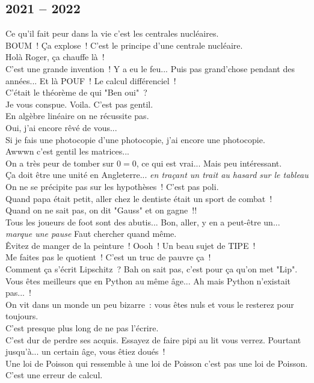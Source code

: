 \documentclass[french, a4paper, openany]{book}
\begin{document}
	\subsection*{2021 -- 2022}
		\noindent \og Ce qu'il fait peur dans la vie c'est les centrales nucléaires. \fg \\
		\og BOUM~! Ça explose~! C'est le principe d'une centrale nucléaire. \fg \\
		\og Holà Roger, ça chauffe là~! \fg \\
		\og C'est une grande invention~! Y a eu le feu... Puis pas grand'chose pendant des années... Et là POUF~! Le calcul différenciel~! \fg \\
		\og C'était le théorème de qui "Ben oui"~? \fg \\
		\og Je vous conspue. Voila. C'est pas gentil. \fg \\
		\og En algèbre linéaire on ne récussite pas. \fg \\
		\og Oui, j'ai encore rêvé de vous... \fg \\
		\og Si je fais une photocopie d'une photocopie, j'ai encore une photocopie. \fg \\
		\og Awwwn c'est gentil les matrices... \fg \\
		\og On a très peur de tomber sur $0 = 0$, ce qui est vrai... Mais peu intéressant. \fg \\
		\og Ça doit être une unité en Angleterre... \fg \emph{en traçant un trait au hasard sur le tableau} \\
		\og On ne se précipite pas sur les hypothèses~! C'est pas poli. \fg \\
		\og Quand papa était petit, aller chez le dentiste était un sport de combat~! \fg \\
		\og Quand on ne sait pas, on dit "Gauss" et on gagne~!! \fg \\
		\og Tous les joueurs de foot sont des abutis... Bon, aller, y en a peut-être un... \emph{marque une pause} Faut chercher quand même. \fg \\
		\og Êvitez de manger de la peinture~! Oooh~! Un beau sujet de TIPE~! \fg \\
		\og Me faites pas le quotient~! C'est un truc de pauvre ça~! \fg \\
		\og Comment ça s'écrit Lipschitz~? Bah on sait pas, c'est pour ça qu'on met "Lip". \fg \\
		\og Vous êtes meilleurs que en Python au même âge... Ah mais Python n'existait pas...~!\fg \\
		\og On vit dans un monde un peu bizarre~: vous êtes nuls et vous le resterez pour toujours. \fg \\
		\og C'est presque plus long de ne pas l'écrire. \fg \\
		\og C'est dur de perdre ses acquis. Essayez de faire pipi au lit vous verrez. Pourtant jusqu'à... un certain âge, vous êtiez doués~! \fg \\
		\og Une loi de Poisson qui ressemble à une loi de Poisson c'est pas une loi de Poisson. C'est une erreur de calcul. \fg \\
\end{document}

